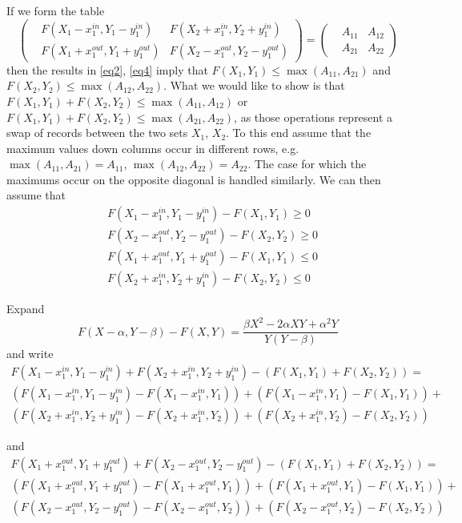 \documentclass{article}
\theoremstyle{case}
\begin{document}
If we form the table
\[
\begin{pmatrix}
&F(X_1 - x_1^{in}, Y_1 - y_1^{in}) & F(X_2 + x_1^{in}, Y_2 + y_1^{in}) \\
&F(X_1 + x_1^{out}, Y_1 + y_1^{out}) & F(X_2 - x_1^{out}, Y_2 - y_1^{out})
\end{pmatrix} = \begin{pmatrix}
&A_{11} & A_{12} \\
&A_{21} & A_{22}
\end{pmatrix}
\]
then the results in \ref{eq2}, \ref{eq4} imply that $F(X_1, Y_1) \leq \max{\left(A_{11}, A_{21}\right)}$ and $F(X_2, Y_2) \leq \max{\left(A_{12}, A_{22}\right)}$. What we would like to show is that $F(X_1, Y_1) + F(X_2, Y_2) \leq \max{\left(A_{11}, A_{12}\right)}$ or $F(X_1, Y_1) + F(X_2, Y_2) \leq \max{\left(A_{21}, A_{22}\right)}$, as those operations represent a swap of records between the two sets $X_1$, $X_2$. To this end assume that the maximum values down columns occur in different rows, e.g. $\max{\left(A_{11}, A_{21}\right)} = A_{11}$, $\max{\left(A_{12}, A_{22}\right)} = A_{22}$. The case for which the maximums occur on the opposite diagonal is handled similarly. We can then assume that 
\begin{align}
& F(X_1 - x_1^{in}, Y_1 - y_1^{in}) - F(X_1, Y_1) \geq 0 \\
& F(X_2 - x_1^{out}, Y_2 - y_1^{out}) - F(X_2, Y_2) \geq 0 \\
& F(X_1 + x_1^{out}, Y_1 + y_1^{out}) - F(X_1, Y_1) \leq 0 \\
& F(X_2 + x_1^{in}, Y_2 + y_1^{in}) - F(X_2, Y_2) \leq 0
\end{align}

Expand 
\[
F(X - \alpha, Y - \beta) - F(X, Y) = \frac{\beta X^2 - 2\alpha XY + \alpha^2 Y}{Y\left( Y-\beta\right)}
\]
and write
\begin{align*}
F(X_1 - x_1^{in}, Y_1 - y_1^{in}) + F(X_2 + x_1^{in}, Y_2 + y_1^{in}) - \left( F(X_1, Y_1) + F(X_2, Y_2)\right) = \\
\left( F(X_1 - x_1^{in}, Y_1 - y_1^{in}) - F(X_1 - x_1^{in}, Y_1)\right) + \left( F(X_1 - x_1^{in}, Y_1) - F(X_1 , Y_1)\right) + \\
\left( F(X_2 + x_1^{in}, Y_2 + y_1^{in}) - F(X_2 + x_1^{in}, Y_2)\right) + \left( F(X_2 + x_1^{in}, Y_2) - F(X_2, Y_2)\right)
\end{align*}

and
\begin{align*}
F(X_1 + x_1^{out}, Y_1 + y_1^{out}) + F(X_2 - x_1^{out}, Y_2 - y_1^{out}) - \left( F(X_1, Y_1) + F(X_2, Y_2)\right) = \\
\left( F(X_1 + x_1^{out}, Y_1 + y_1^{out}) - F(X_1 + x_1^{out}, Y_1)\right) + \left( F(X_1 + x_1^{out}, Y_1) - F(X_1 , Y_1)\right) + \\
\left( F(X_2 - x_1^{out}, Y_2 - y_1^{out}) - F(X_2 - x_1^{out}, Y_2)\right) + \left( F(X_2 - x_1^{out}, Y_2) - F(X_2, Y_2)\right)
\end{align*}
\end{document}
